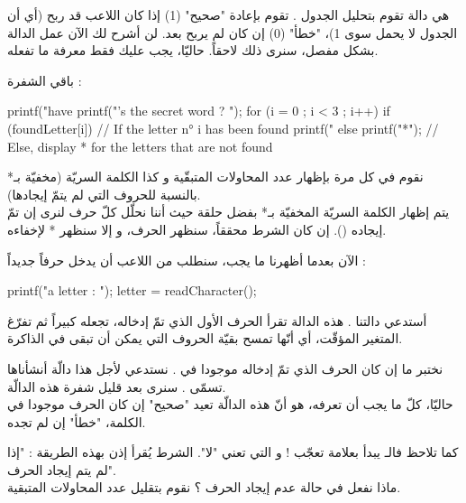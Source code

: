 هي دالة تقوم بتحليل الجدول
.
تقوم بإعادة "صحيح" (1) إذا كان اللاعب قد ربح (أي أن الجدول
لا يحمل سوى 1)، "خطأ" (0) إن كان لم يربح بعد.
لن أشرح لك الآن عمل الدالة بشكل مفصل، سنرى ذلك لاحقاً. حاليّا، يجب عليك فقط معرفة ما تفعله.

باقي الشفرة :

\begin{Csource}
printf("\n\nYou have %
printf("\nWhat's the secret word ? ");
for (i = 0 ; i < 3 ; i++)
{
  if (foundLetter[i]) // If the letter n° i has been found
    printf("%
  else
    printf("*"); // Else, display * for the letters that are not found
}
\end{Csource}

نقوم في كل مرة بإظهار عدد المحاولات المتبقّية و كذا الكلمة السريّة (مخفيّة بـ* بالنسبة للحروف التي لم يتمّ إيجادها).\\
يتم إظهار الكلمة السريّة المخفيّة بـ* بفضل حلقة
حيث أننا نحلّل كلّ حرف لنرى إن تمّ إيجاده
().
إن كان الشرط محققاً، سنظهر الحرف، و إلا سنظهر * لإخفاءه.

الآن بعدما أظهرنا ما يجب، سنطلب من اللاعب أن يدخل حرفاً جديداً :

\begin{Csource}
printf("\nSuggest a letter : ");
letter = readCharacter();
\end{Csource}

أستدعي دالتنا
.
هذه الدالة تقرأ الحرف الأول الذي تمّ إدخاله، تجعله  كبيراً ثم تفرّغ المتغير المؤقّت، أي أنّها تمسح بقيّة الحروف التي يمكن أن تبقى في الذاكرة.

\begin{Csource}
// if it's NOT the right letter
if (!findLetter(letter, secretWord, foundLetter))
  {
    remainingTries--; // Decrement the remaining tries
  }
}
\end{Csource}

نختبر ما إن كان الحرف الذي تمّ إدخاله موجودا في
.
نستدعي لأجل هذا دالّة أنشأناها تسمّى
.
سنرى بعد قليل شفرة هذه الدالّة.\\
حاليّا، كلّ ما يجب أن تعرفه، هو أنّ هذه الدالّة تعيد "صحيح" إن كان الحرف موجودا في الكلمة، "خطأ" إن لم تجده.

كما تلاحظ فالـ
يبدأ بعلامة تعجّب ! و التي تعني "لا". الشرط يُقرأ إذن بهذه الطريقة : "إذا لم يتم إيجاد الحرف".\\
ماذا نفعل في حالة عدم إيجاد الحرف ؟ نقوم بتقليل عدد المحاولات المتبقية.

